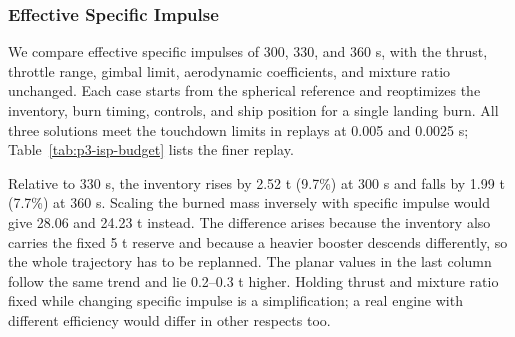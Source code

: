 \subsubsection{Effective Specific Impulse}
We compare effective specific impulses of 300, 330, and 360 s, with the thrust, throttle range, gimbal limit, aerodynamic coefficients, and mixture ratio unchanged. Each case starts from the spherical reference and reoptimizes the inventory, burn timing, controls, and ship position for a single landing burn. All three solutions meet the touchdown limits in replays at 0.005 and 0.0025 s; Table~\ref{tab:p3-isp-budget} lists the finer replay.



Relative to 330 s, the inventory rises by 2.52 t (9.7\%) at 300 s and falls by 1.99 t (7.7\%) at 360 s. Scaling the burned mass inversely with specific impulse would give 28.06 and 24.23 t instead. The difference arises because the inventory also carries the fixed 5 t reserve and because a heavier booster descends differently, so the whole trajectory has to be replanned. The planar values in the last column follow the same trend and lie 0.2--0.3 t higher. Holding thrust and mixture ratio fixed while changing specific impulse is a simplification; a real engine with different efficiency would differ in other respects too.
